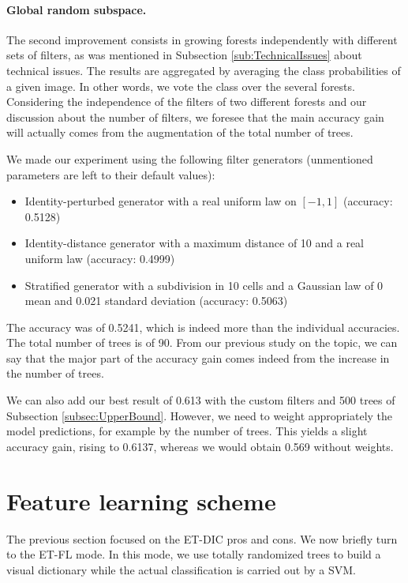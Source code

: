 \documentclass[a4paper]{report}
\begin{document}
	
	
	\paragraph{Global random subspace.}
	The second improvement consists in growing forests independently with different sets of filters, as was mentioned in Subsection \ref{sub:TechnicalIssues} about technical issues. The results are aggregated by averaging the class probabilities of a given image. In other words, we vote the class over the several forests.
	Considering the independence of the filters of two different forests and our discussion about the number of filters, we foresee that the main accuracy gain will actually comes from the augmentation of the total number of trees. 
	\par
	We made our experiment using the following filter generators (unmentioned parameters are left to their default values): 
	\begin{itemize}
		\item Identity-perturbed generator with a real uniform law on $[-1, 1]$ (accuracy: 0.5128)	 %
		\item Identity-distance generator with a maximum distance of 10 and a real uniform law (accuracy: 0.4999) %
		\item Stratified generator with a subdivision in 10 cells and a Gaussian law of 0 mean and 0.021 standard deviation (accuracy: 0.5063) %
	\end{itemize}
	The accuracy was of 0.5241, which is indeed more than the individual accuracies. The total number of trees is of 90. From our previous study on the topic, we can say that the major part of the accuracy gain comes indeed from the increase in the number of trees.
	\par
	We can also add our best result of 0.613 with the custom filters and 500 trees of Subsection \ref{subsec:UpperBound}. However, we need to weight appropriately the model predictions, for example by the number of trees. This yields a slight accuracy gain, rising to 0.6137, whereas we would obtain 0.569 without weights. 
	
	
	
	
	
	

	
	\section{Feature learning scheme}
	The previous section focused on the ET-DIC pros and cons. We now briefly turn to the ET-FL mode. In this mode, we use totally randomized trees to build a visual dictionary while the actual classification is carried out by a SVM. 
\end{document}
